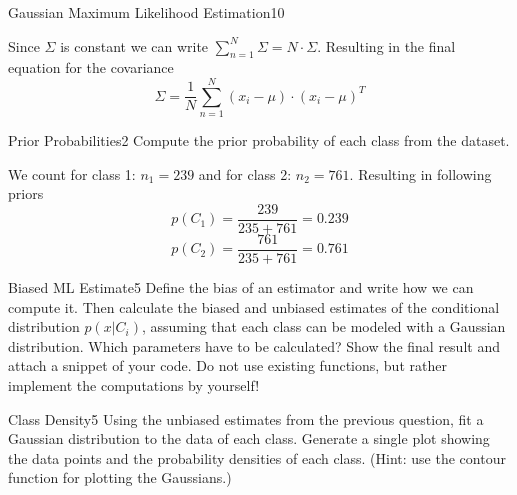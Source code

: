 \begin{questions}
\begin{question}{Gaussian Maximum Likelihood Estimation}{10}
\begin{answer}
Since $\Sigma$ is constant we can write $\sum_{n=1}^{N}\Sigma = N\cdot\Sigma$.
Resulting in the final equation for the covariance
\begin{equation}
	\Sigma = \frac{1}{N} \sum_{n=1}^{N}(x_i -\mu)\cdot(x_i - \mu)^T
\end{equation}

\end{answer}

\end{question}


\begin{question}{Prior Probabilities}{2}
Compute the prior probability of each class from the dataset. 

\begin{answer}
We count for class 1: $n_1 = 239$ and for class 2: $n_2 = 761$. Resulting in following priors
\begin{equation}
	p(C_1) = \frac{239}{235+761} = 0.239
\end{equation}
\begin{equation}
    p(C_2) = \frac{761}{235+761} = 0.761
\end{equation}

\end{answer}

\end{question}



\begin{question}{Biased ML Estimate}{5}
Define the bias of an estimator and write how we can compute it.
Then calculate the biased and unbiased estimates of the conditional distribution $p(x|C_i)$, assuming that each class can be modeled with a Gaussian distribution. Which parameters have to be calculated?
Show the final result and attach a snippet of your code.
Do not use existing functions, but rather implement the computations by yourself!

\begin{answer}\end{answer}

\end{question}



\begin{question}{Class Density}{5}
Using the unbiased estimates from the previous question, fit a Gaussian distribution to the data of each class. Generate a single plot showing the data points and the probability densities of each class.
(Hint: use the contour function for plotting the Gaussians.) 


\end{question}
\end{questions}
